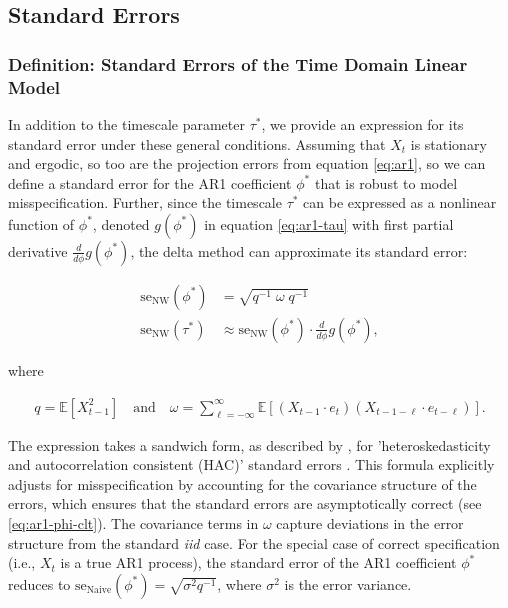 \documentclass[main.tex]{subfiles}
\begin{document}
\subsection{Standard Errors}
\subsubsection{Definition: Standard Errors of the Time Domain Linear Model}

In addition to the timescale parameter $\tau^*$, we provide an expression for its standard error under these general conditions. Assuming that $X_t$ is stationary and ergodic, so too are the projection errors from equation \eqref{eq:ar1}, so we can define a standard error for the AR1 coefficient $\phi^*$ that is robust to model misspecification. Further, since the timescale $\tau^*$ can be expressed as a nonlinear function of $\phi^*$, denoted $g(\phi^*)$ in equation \eqref{eq:ar1-tau} with first partial derivative $\frac{d}{d\phi} g(\phi^*)$, the delta method can approximate its standard error:

\begin{align}
    \text{se}_{\text{NW}}(\phi^*) &= \sqrt{q^{-1}\; \omega \; q^{-1}} \label{eq:se-ar1-phi}\\
    \text{se}_{\text{NW}}(\tau^*) &\approx \text{se}_{\text{NW}}(\phi^*) \cdot \frac{d}{d\phi} g(\phi^*),
\end{align}

\noindent where

\begin{align*}
    q = \mathbb{E}[X_{t-1}^2] \quad\text{and}\quad \omega = \sum_{\ell=-\infty}^{\infty} \mathbb{E}[(X_{t-1} \cdot e_t)(X_{t-1-\ell} \cdot e_{t-\ell})].
\end{align*}

The expression takes a sandwich form, as described by \citet{newey_simple_1987}, for 'heteroskedasticity and autocorrelation consistent (HAC)' standard errors \citep[theorem 14.32]{hansen_econometrics_2022}. This formula explicitly adjusts for misspecification by accounting for the covariance structure of the errors, which ensures that the standard errors are asymptotically correct (see \eqref{eq:ar1-phi-clt}). The covariance terms in $\omega$ capture deviations in the error structure from the standard \textit{iid} case. For the special case of correct specification (i.e., $X_t$ is a true AR1 process), the standard error of the AR1 coefficient $\phi^*$ reduces to $\text{se}_{\text{Naive}}(\phi^*) = \sqrt{\sigma^2 q^{-1}}$, where $\sigma^2$ is the error variance. \\
\end{document}
